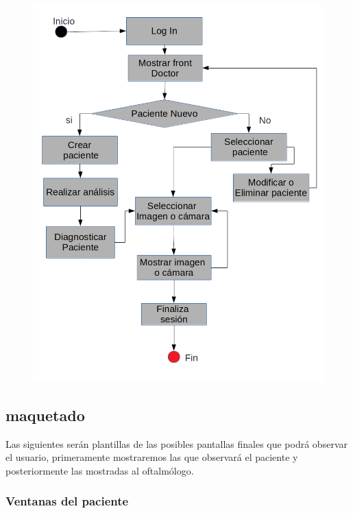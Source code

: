 \documentclass[10pt]{article}
\begin{document}
\begin{figure}[H]
	\begin{center}
\includegraphics[scale = 0.70]{Imagenes/flow.png}
	\end{center} 
\end{figure}

\subsection{maquetado}
Las siguientes serán plantillas de las posibles pantallas finales que podrá observar el usuario, primeramente mostraremos las que observará el paciente y posteriormente las mostradas al oftalmólogo.
\subsubsection{Ventanas del paciente}
\end{document}
